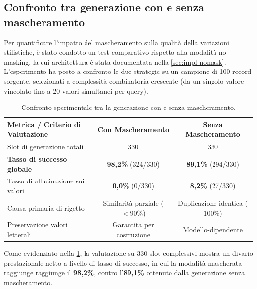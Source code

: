 \documentclass[12pt,a4paper,openright,twoside]{book}
\begin{document}
\subsection{Confronto tra generazione con e senza mascheramento}
\label{sec:eval-masking-comparison}

Per quantificare l'impatto del mascheramento sulla qualità della variazioni
stilistiche, è stato condotto un test comparativo rispetto alla modalità
no-masking, la cui architettura è stata documentata nella
\cref{sec:impl-nomask}. L'esperimento ha posto a confronto le due strategie su
un campione di 100 record sorgente, selezionati a complessità combinatoria
crescente (da un singolo valore vincolato fino a 20 valori simultanei per
query).

\begin{table}[H]
    \centering
    \small
    \renewcommand{\arraystretch}{1.2}
    \begin{tabularx}{\textwidth}{X c c}
        \toprule
        \textbf{Metrica / Criterio di Valutazione} & \textbf{Con Mascheramento}
                                                   & \textbf{Senza
                                                         Mascheramento}
        \\
        \midrule
        Slot di generazione totali                 & 330
                                                   & 330                        \\
        \textbf{Tasso di successo globale}         & \textbf{98,2\%} (324/330)
                                                   & \textbf{89,1\%} (294/330)
        \\
        Tasso di allucinazione sui valori          & \textbf{0,0\%} (0/330)
                                                   & \textbf{8,2\%} (27/330)
        \\
        Causa primaria di rigetto                  & Similarità parziale
        ($<90\%$)                                  & Duplicazione identica
        ($100\%$)
        \\
        Preservazione valori letterali             & Garantita per costruzione
                                                   & Modello-dipendente
        \\
        \bottomrule
    \end{tabularx}
    \caption{Confronto sperimentale tra la generazione con e senza mascheramento.}
    \label{tab:masking-comparison}
\end{table}

Come evidenziato nella \cref{tab:masking-comparison}, la valutazione su 330 slot
complessivi mostra un divario prestazionale netto a livello di tasso di
successo, in cui la modalità mascherata raggiunge raggiunge il \textbf{98,2\%},
contro l'\textbf{89,1\%} ottenuto dalla generazione senza mascheramento.
\end{document}
